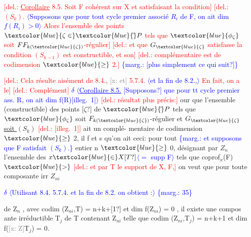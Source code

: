 \documentclass[11pt]{article}
\newcommand{\scanpage}[1]{\par\bigskip\noindent{\small\sffamily[scan #1]}\par}
\newcommand{\mspage}[1]{{\small\sffamily[p.\,#1]}}
\newcommand{\hand}[1]{\textcolor{blue}{#1}}
\let\over\relax
\newcommand{\over}[2]{\textcolor{gray}{#1}\textcolor{blue}{\ensuremath{^{\!\nearrow}}#2}}
\newcommand{\inserted}[2][]{\textcolor{blue}{$\langle$#2$\rangle$}}
\newcommand{\margin}[1]{\textcolor{blue}{\{\textsf{marg.:} #1\}}}
\newcommand{\deleted}[1]{\textcolor{red}{[\textsf{del.:} #1]}}
\newcommand{\xout}[1]{\textcolor{gray}{[\textsf{x:} #1]}}
\newcommand{\uline}[1]{\underline{#1}}
\newcommand{\unsure}[1]{[#1?]}
\newcommand{\illegible}[1]{[\textsf{illeg.\ #1}]}
\begin{document}
\deleted{\uline{Corollaire} 8.5. Soit F cohérent sur X et satisfaisant la condition}
\deleted{$(S_k)$. \inserted{Supposons que pour tout cycle premier associé $R_i$ de F, on ait dim $f(R_i)>0$} Alors l'ensemble des points $\hand{\zeta \in} \hand{\check{}}P$ tels que $\hand{\phi_\zeta}$ soit $\over{F}{F}_{k(\hand{\zeta})}$-régulier}
\deleted{et que $G_{\hand{\zeta}}$ satisfasse la condition $(S_{k-1})$ est constructible, et son}
\deleted{complémentaire est de codimension $\hand{\geq}$ 2.} \margin{\unsure{plus simplement ce qui suit}}

\deleted{Cela résulte aisément de 8.4., \xout{et} 5.7.4. \inserted{et la fin de 8.2.,} En fait, on a le}
\deleted{Complément} \hand{$\delta$} \inserted{\uline{Corollaire 8.5.} \unsure{Supposons} que pour tt cycle premier ass. R, on ait dim f(R)\illegible{1}}
\deleted{résultat plus précis:} \over{P}{p}our que l'ensemble (constructible) des points \unsure{$\zeta$}
de $\hand{\check{}}P$ tels que $\hand{\phi_\zeta}$ soit $F_{k(\hand{\zeta})}$-régulier et $G_{\hand{\zeta}}$ \uline{soit $(S_k)$} \deleted{\illegible{1}} ait un complé-
mentaire de codimension $\hand{\geq}$ 2, il f et s qu'on ait ceci: pour tout \margin{et supposons que F satisfait $(S_k)$.}
entier n $\hand{\geq}$ 0, désignant par $Z_n$ l'ensemble des $x \hand{\in} \over{X}{\unsure{T}}$\inserted{$=$ supp F} tels que coprof$_x$(F) $\hand{>}$
\deleted{et par T le support de X, F,} on veut que pour toute composante irr $Z_{ni}$

\hand{$\delta$} \inserted{Utilisant 8.4. 5.7.4. et la fin de 8.2. on obtient :}
\margin{35}

\clearpage
\scanpage{25/36}
\mspage{32}

de Z$_n$ , avec codim (Z$_{ni}$,T) = n+k+\unsure{1} et dim f(Z$_{ni}$) = 0 , il existe
une compos ante irréductible T$_j$ de T contenant Z$_{ni}$ telle que
codim (Z$_{ni}$,T$_j$) = n+k+1 et dim f(\xout{Z}T$_j$) = 0.
\end{document}
